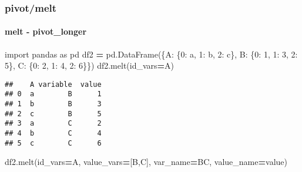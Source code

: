 \documentclass[
]{article}
\newenvironment{Shaded}{\begin{snugshade}}{\end{snugshade}}
\newcommand{\DecValTok}[1]{\textcolor[rgb]{0.00,0.00,0.81}{#1}}
\newcommand{\ImportTok}[1]{#1}
\newcommand{\NormalTok}[1]{#1}
\newcommand{\OperatorTok}[1]{\textcolor[rgb]{0.81,0.36,0.00}{\textbf{#1}}}
\newcommand{\StringTok}[1]{\textcolor[rgb]{0.31,0.60,0.02}{#1}}
\begin{document}
\hypertarget{pivotmelt}{%
\subsubsection{pivot/melt}\label{pivotmelt}}

\hypertarget{melt---pivot_longer}{%
\paragraph{\texorpdfstring{{ melt - pivot\_longer
}}{ melt - pivot\_longer }}\label{melt---pivot_longer}}

\begin{Shaded}
\begin{Highlighting}[]
\ImportTok{import}\NormalTok{ pandas }\ImportTok{as}\NormalTok{ pd}
\NormalTok{df2 }\OperatorTok{=}\NormalTok{ pd.DataFrame(\{}\StringTok{\textquotesingle{}A\textquotesingle{}}\NormalTok{: \{}\DecValTok{0}\NormalTok{: }\StringTok{\textquotesingle{}a\textquotesingle{}}\NormalTok{, }\DecValTok{1}\NormalTok{: }\StringTok{\textquotesingle{}b\textquotesingle{}}\NormalTok{, }\DecValTok{2}\NormalTok{: }\StringTok{\textquotesingle{}c\textquotesingle{}}\NormalTok{\},}
                   \StringTok{\textquotesingle{}B\textquotesingle{}}\NormalTok{: \{}\DecValTok{0}\NormalTok{: }\DecValTok{1}\NormalTok{, }\DecValTok{1}\NormalTok{: }\DecValTok{3}\NormalTok{, }\DecValTok{2}\NormalTok{: }\DecValTok{5}\NormalTok{\},}
                   \StringTok{\textquotesingle{}C\textquotesingle{}}\NormalTok{: \{}\DecValTok{0}\NormalTok{: }\DecValTok{2}\NormalTok{, }\DecValTok{1}\NormalTok{: }\DecValTok{4}\NormalTok{, }\DecValTok{2}\NormalTok{: }\DecValTok{6}\NormalTok{\}\})}
\NormalTok{df2.melt(id\_vars}\OperatorTok{=}\StringTok{\textquotesingle{}A\textquotesingle{}}\NormalTok{)}
\end{Highlighting}
\end{Shaded}

\begin{verbatim}
##    A variable  value
## 0  a        B      1
## 1  b        B      3
## 2  c        B      5
## 3  a        C      2
## 4  b        C      4
## 5  c        C      6
\end{verbatim}

\begin{Shaded}
\begin{Highlighting}[]
\NormalTok{df2.melt(id\_vars}\OperatorTok{=}\StringTok{\textquotesingle{}A\textquotesingle{}}\NormalTok{, value\_vars}\OperatorTok{=}\NormalTok{[}\StringTok{\textquotesingle{}B\textquotesingle{}}\NormalTok{,}\StringTok{\textquotesingle{}C\textquotesingle{}}\NormalTok{], var\_name}\OperatorTok{=}\StringTok{\textquotesingle{}BC\textquotesingle{}}\NormalTok{, value\_name}\OperatorTok{=}\StringTok{\textquotesingle{}value\textquotesingle{}}\NormalTok{)}
\end{Highlighting}
\end{Shaded}
\end{document}
